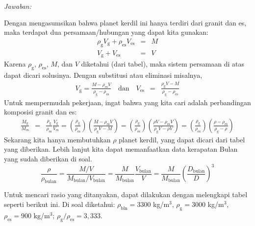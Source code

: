 \documentclass[11pt,fleqn]{exam}
\begin{document}
\begin{questions}
\textit{Jawaban: } 

Dengan mengasumsikan bahwa planet kerdil ini hanya terdiri dari granit dan es, maka terdapat dua persamaan/hubungan yang dapat kita gunakan:
\begin{eqnarray*}
\rho_{\text{g}} V_{\text{g}} + \rho_{\text{es}} V_{\text{es}} &=& M\\
V_{\text{g}} + V_{\text{es}} &=& V
\end{eqnarray*}
Karena $\rho_{\text{g}}$, $\rho_{\text{es}}$, $M$, dan $V$ diketahui (dari tabel), maka sistem persamaan di atas dapat dicari solusinya. Dengan substitusi atau eliminasi misalnya, 
\begin{eqnarray*}
V_{\text{g}} = \frac{M - \rho_{\text{es}} V}{\rho_{\text{g}} - \rho_{\text{es}} }\quad \text{dan} \quad V_{\text{es}} &=& \frac{\rho_{\text{g}} V - M}{\rho_{\text{g}} - \rho_{\text{es}} }
\end{eqnarray*}
Untuk mempermudah pekerjaan, ingat bahwa yang kita cari adalah perbandingan komposisi granit dan es:
\begin{eqnarray*}
\frac{M_{\text{g}}}{M_{\text{es}}} &=& \frac{\rho_{\text{g}}}{\rho_{\text{es}}}\frac{V_{\text{g}}}{V_{\text{es}}} = \left(\frac{\rho_{\text{g}}}{\rho_{\text{es}}}\right) \left(\frac{M - \rho_{\text{es}} V}{\rho_{\text{g}} V - M}\right) = \left(\frac{\rho_{\text{g}}}{\rho_{\text{es}}}\right) \left(\frac{\rho V - \rho_{\text{es}} V}{\rho_{\text{g}} V - \rho V}\right) = \left(\frac{\rho_{\text{g}}}{\rho_{\text{es}}}\right) \left(\frac{\rho - \rho_{\text{es}}}{\rho_{\text{g}} - \rho}\right)
\end{eqnarray*}
Sekarang kita hanya membutuhkan $\rho$ planet kerdil, yang dapat dicari dari tabel yang diberikan. Lebih lanjut kita dapat memanfaatkan data kerapatan Bulan yang sudah diberikan di soal.
$$\frac{\rho}{\rho_{\text{bulan}}} = \frac{M/V}{M_{\text{bulan}}/V_{\text{bulan}}} = \frac{M}{M_{\text{bulan}}} \frac{V_{\text{bulan}}}{V} = \frac{M}{M_{\text{bulan}}} \left(\frac{D_{\text{bulan}}}{D}\right)^{3}$$

Untuk mencari rasio yang ditanyakan, dapat dilakukan dengan melengkapi tabel seperti berikut ini. Di soal diketahui: $\rho_{\text{bln}} = 3300$ kg/m$^3$, $\rho_{\text{g}} = 3000$ kg/m$^3$, $\rho_{\text{es}} = 900$ kg/m$^3$; $\rho_{\text{g}} / \rho_{\text{es}} = 3,333$. 


\end{questions}
\end{document}
